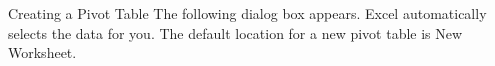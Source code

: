 \documentclass[xcolor=svgnames, handout]{beamer}
\begin{document}
\begin{frame}{Creating a Pivot Table}
The following dialog box appears. Excel automatically selects the data for you. The default location for a new pivot table is New Worksheet.

\begin{center}
\end{center}
\end{frame}
\end{document}
